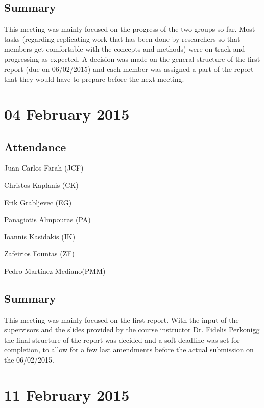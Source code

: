 \documentclass[a4paper,11pt]{article}
\begin{document}
\subsection*{Summary}
This meeting was mainly focused on the progress of the two groups so far. Most tasks (regarding replicating work that has been done by researchers so that members get comfortable with the concepts and methods) were on track and progressing as expected. A decision was made on the general structure of the first report (due on 06/02/2015) and each member was assigned a part of the report that they would have to prepare before the next meeting.

\maketitle
\section*{04 February 2015}
\subsection*{Attendance}
\begin{compactenum}
\item Juan Carlos Farah (JCF)
\item Christos Kaplanis (CK)
\item Erik Grabljevec (EG)
\item Panagiotis Almpouras (PA)
\item Ioannis Kasidakis (IK)
\item Zafeirios Fountas (ZF)
\item Pedro Martínez Mediano(PMM)
\end{compactenum}

\subsection*{Summary}
This meeting was mainly focused on the first report. With the input of the supervisors and the slides provided by the course instructor Dr. Fidelis Perkonigg the final structure of the report was decided and a soft deadline was set for completion, to allow for a few last amendments before the actual submission on the 06/02/2015.

\maketitle
\section*{11 February 2015}
\end{document}
